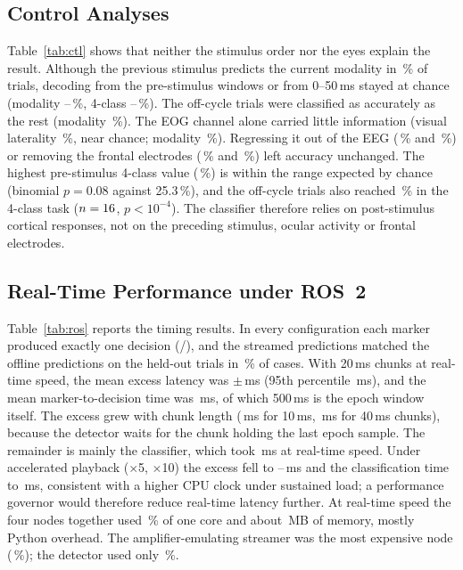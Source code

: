 \documentclass[conference]{IEEEtran}
\begin{document}
\subsection{Control Analyses}\label{sec:ctl}
Table~\ref{tab:ctl} shows that neither the stimulus order nor the eyes explain the result. Although the previous stimulus predicts the current modality in \PrevPred\,\% of trials, decoding from the pre-stimulus windows or from 0--50\,ms stayed at chance (modality \PreMin--\PreMax\,\%, 4-class \PreFourMin--\PreFourMax\,\%). The \OffCycleN{} off-cycle trials were classified as accurately as the rest (modality \OffCycleMod\,\%). The EOG channel alone carried little information (visual laterality \EogVis\,\%, near chance; modality \EogMod\,\%). Regressing it out of the EEG (\EogRegMod\,\% and \EogRegVis\,\%) or removing the \FrontN{} frontal electrodes (\FrontMod\,\% and \FrontVis\,\%) left accuracy unchanged. The highest pre-stimulus 4-class value (\PreFourMax\,\%) is within the range expected by chance (binomial $p=0.08$ against 25.3\,\%), and the off-cycle trials also reached \OffCycleFour\,\% in the 4-class task ($n=16$, $p<10^{-4}$). The classifier therefore relies on post-stimulus cortical responses, not on the preceding stimulus, ocular activity or frontal electrodes.



\subsection{Real-Time Performance under ROS~2}
Table~\ref{tab:ros} reports the timing results. In every configuration each marker produced exactly one decision (\RosNdec/\RosNmark), and the streamed predictions matched the offline predictions on the held-out trials in \RosAgree\,\% of cases. With 20\,ms chunks at real-time speed, the mean excess latency was \RosExcess$\pm$\RosExcessSd\,ms (95th percentile \RosExcessP\,ms), and the mean marker-to-decision time was \RosTotal\,ms, of which 500\,ms is the epoch window itself. The excess grew with chunk length (\RosExTen\,ms for 10\,ms, \RosExForty\,ms for 40\,ms chunks), because the detector waits for the chunk holding the last epoch sample. The remainder is mainly the classifier, which took \RosProc\,ms at real-time speed. Under accelerated playback ($\times$5, $\times$10) the excess fell to \RosFastExMin--\RosFastExMax\,ms and the classification time to \RosFastProc\,ms, consistent with a higher CPU clock under sustained load; a performance governor would therefore reduce real-time latency further. At real-time speed the four nodes together used \RosCpuAll\,\% of one core and about \RosRss\,MB of memory, mostly Python overhead. The amplifier-emulating streamer was the most expensive node (\CpuStreamer\,\%); the detector used only \CpuDet\,\%.
\end{document}
